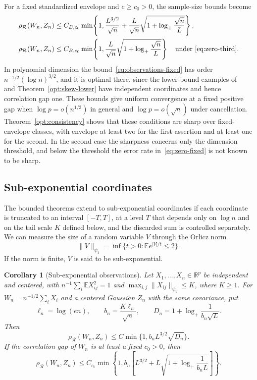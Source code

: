 \documentclass[11pt,letterpaper]{article}
\newif\ifshowrev
\newcommand{\rev}[1]{\ifshowrev{\color{revblue}%
\hypersetup{linkcolor=revblue,citecolor=revblue,urlcolor=revblue}#1}\else#1\fi}
\newif\ifshowpass
\newcommand{\pass}[1]{\ifshowpass{\color{revblue}%
\hypersetup{linkcolor=revblue,citecolor=revblue,urlcolor=revblue}#1}\else#1\fi}
\newif\ifshowintro
\newcommand{\itx}[1]{\ifshowintro{\color{revblue}%
\hypersetup{linkcolor=revblue,citecolor=revblue,urlcolor=revblue}#1}\else#1\fi}
\newtheorem{corollary}{Corollary}
\theoremstyle{remark}
\newcommand{\E}{\mathbb E}
\newcommand{\R}{\mathbb R}
\newcommand{\rh}{\rho_{\mathcal R}}
\begin{document}
For a fixed standardized envelope and \(c\ge c_0>0\), the sample-size
bounds become
\begin{align}
 \rh(W_n,Z_n)&\le C_{B,c_0}\min\!\left\{1,
 \frac{L^{3/2}}{\sqrt n}
 +\frac L{\sqrt n}\sqrt{1+\log_+\frac{\sqrt n}{L}}\right\},
 \label{eq:observations-fixed}\\
 \rh(W_n,Z_n)&\le C_{B,c_0}\min\!\left\{1,
 \frac L{\sqrt n}\sqrt{1+\log_+\frac{\sqrt n}{L}}\right\}
 \quad\text{under~\eqref{eq:zero-third}}.
 \label{eq:zero-fixed}
\end{align}
\pass{In polynomial dimension the bound~\eqref{eq:observations-fixed}
has order \(n^{-1/2}(\log n)^{3/2}\), and it is optimal there, since the
lower-bound examples of~\cite[Proposition~2.1]{CCK} and
Theorem~\ref{opt:skew-lower} have independent coordinates and hence
correlation gap one.} These bounds give uniform convergence at a fixed
positive gap when \(\log p=o(n^{1/3})\) in general and \(\log p=o(\sqrt n)\)
under cancellation. Theorem~\ref{opt:consistency} shows that these
conditions are sharp over fixed-envelope classes, with envelope at least
two for the first assertion and at least one for the second. \rev{In
the second case the sharpness concerns only the dimension threshold, and
below the threshold the error rate in~\eqref{eq:zero-fixed} is not known
to be sharp.}

\subsection{Sub-exponential coordinates}\label{sec:subexponential}
\rev{The bounded theorems extend to sub-exponential coordinates if each
coordinate is \itx{truncated} to an interval \([-T,T]\), at a
level \(T\) that depends only on \(\log n\) \itx{and on the tail scale \(K\) defined below}, and the discarded sum is
controlled separately. \itx{We can measure the size of a random variable \(V\) through
the Orlicz norm}}
\[
 \|V\|_{\psi_1}=\inf\{t>0:\E e^{|V|/t}\le2\}.
\]
\itx{If the norm is finite, \(V\) is said to be sub-exponential.}

\begin{corollary}[Sub-exponential observations]\label{cor:subexponential}
Let \(X_1,\ldots,X_n\in\R^p\) be independent and centered, with
\(n^{-1}\sum_i\E X_{ij}^2=1\) and
\(\max_{i,j}\|X_{ij}\|_{\psi_1}\le K\), where \(K\ge1\).
For \(W_n=n^{-1/2}\sum_iX_i\) and a centered Gaussian \(Z_n\)
with the same covariance, put
\[
 \ell_n=\log(en),\qquad b_n=\frac{K\ell_n}{\sqrt n},\qquad
 D_n=1+\log_+\frac1{b_n\sqrt L}.
\]
Then
\begin{equation}
 \rh(W_n,Z_n)\le C\min\{1,b_nL^{3/2}\sqrt{D_n}\}.
 \label{eq:subexponential}
\end{equation}
If the correlation gap of \(W_n\) is at least a fixed \(c_0>0\), then
\begin{equation}
 \rh(W_n,Z_n)\le C_{c_0}\min\!\left\{1,
 b_n\left[L^{3/2}+L\sqrt{1+\log_+\frac1{b_nL}}\right]\right\}.
 \label{eq:subexponential-gap}
\end{equation}
\end{corollary}
\end{document}
